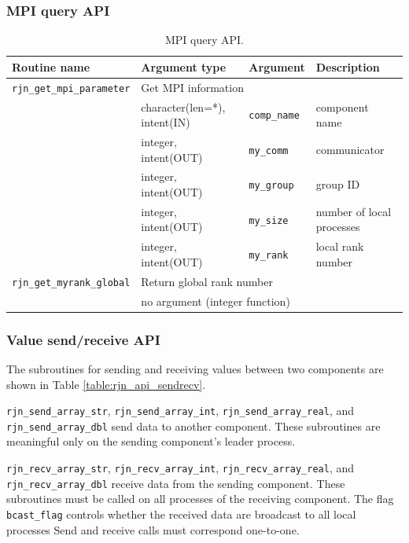 \documentclass[11pt,a4paper]{report}
\newcommand{\tabref}[1]{Table \ref{#1}}
\begin{document}
\subsubsection{MPI query API}

\begin{table}[H]
\begin{center}
\caption{MPI query API.}
{\small
\label{table:rjn_api_mpi}
\begin{tabular}{llll}
\hline\hline
Routine name & Argument type & Argument & Description \\
\hline
 \texttt{rjn\_get\_mpi\_parameter} & \multicolumn{3}{l}{Get MPI information} \\
                & character(len=*), intent(IN) & \texttt{comp\_name} & component name\\
                & integer, intent(OUT) & \texttt{my\_comm} & communicator\\
                & integer, intent(OUT) & \texttt{my\_group} & group ID\\
                & integer, intent(OUT) & \texttt{my\_size} & number of local processes\\
                & integer, intent(OUT) & \texttt{my\_rank} & local rank number\\
\hline
 \texttt{rjn\_get\_myrank\_global} & \multicolumn{3}{l}{Return global rank number}\\
                & \multicolumn{3}{l}{no argument (integer function)} \\
\hline\hline
\end{tabular}
}
\end{center}
\end{table}

\subsubsection{Value send/receive API}

The subroutines for sending and receiving values
between two components
are shown in \tabref{table:rjn_api_sendrecv}.

\texttt{rjn\_send\_array\_str}, \texttt{rjn\_send\_array\_int},
\texttt{rjn\_send\_array\_real}, and \texttt{rjn\_send\_array\_dbl}
send data to another component.
These subroutines are meaningful
only on the sending component's leader process.

\texttt{rjn\_recv\_array\_str}, \texttt{rjn\_recv\_array\_int},
\texttt{rjn\_recv\_array\_real}, and \texttt{rjn\_recv\_array\_dbl}
receive data
from the sending component.
These subroutines must be called
on all processes of the receiving component.
The flag \texttt{bcast\_flag}
controls whether the received data
are broadcast to all local processes
Send and receive calls must correspond one-to-one.
\end{document}

